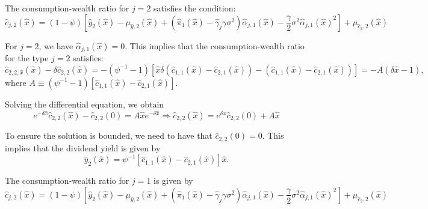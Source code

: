 \documentclass[11pt,english]{article}
\begin{document}
The consumption-wealth ratio for $j=2$ satisfies the condition:
\begin{equation}
    \hat{c}_{j,2}(\hat{x}) = (1-\psi) \left[ \hat{y}_2(\hat{x}) - \mu_{\hat{y},2}(\hat{x})  + (\hat{\pi}_1(\hat{x})-\hat{\gamma}_j \gamma \sigma^2)\hat{\alpha}_{j,1}(\hat{x})- \frac{\gamma}{2} \sigma^2 \hat{\alpha}_{j,1}(\hat{x})^2 
  \right] + \mu_{\hat{c}_2,2}(\hat{x})
\end{equation}

For $j = 2$, we have $\hat{\alpha}_{j,1}(\hat{x}) = 0$. This implies that the consumption-wealth ratio for the type $j=2$ satisfies:
\begin{equation}
    \hat{c}_{2,2,\hat{x}}(\hat{x})-\delta \hat{c}_{2,2}(\hat{x}) = -(\psi^{-1}-1) \left[ \hat{x} \delta (\hat{c}_{1,1}(\hat{x})-\hat{c}_{2,1}(\hat{x}))  - (\hat{c}_{1,1}(\hat{x})-\hat{c}_{2,1}(\hat{x})) 
  \right]= - A(\delta \hat{x}-1),
\end{equation}
where $A \equiv (\psi^{-1}-1) \left[ \hat{c}_{1,1}(\hat{x})-\hat{c}_{2,1}(\hat{x})\right]$.


Solving the differential equation, we obtain
\begin{equation}
    e^{-\delta \hat{x}} \hat{c}_{2,2}(\hat{x})-\hat{c}_{2,2}(0)  =  A \hat{x} e^{-\delta \hat{x}} \Rightarrow \hat{c}_{2,2}(\hat{x}) = e^{\delta \hat{x}} \hat{c}_{2,2}(0) + A \hat{x}
\end{equation}

To ensure the solution is bounded, we need to have that $\hat{c}_{2,2}(0) = 0$. This implies that the dividend yield is given by
\begin{equation}
    \hat{y}_2(\hat{x}) = \psi^{-1} \left[ \hat{c}_{1,1}(\hat{x}) - \hat{c}_{2,1}(\hat{x}) \right] \hat{x}.
\end{equation}




The consumption-wealth ratio for $j=1$ is given by
\begin{equation}
    \hat{c}_{j,2}(\hat{x}) = (1-\psi) \left[ \hat{y}_2(\hat{x}) - \mu_{\hat{y},2}(\hat{x})  + (\hat{\pi}_1(\hat{x})-\hat{\gamma}_j \gamma \sigma^2)\hat{\alpha}_{j,1}(\hat{x})- \frac{\gamma}{2} \sigma^2 \hat{\alpha}_{j,1}(\hat{x})^2 
  \right] + \mu_{\hat{c}_2,2}(\hat{x})
\end{equation}



\newpage
\singlespacing
%
\clearpage

\end{document}
